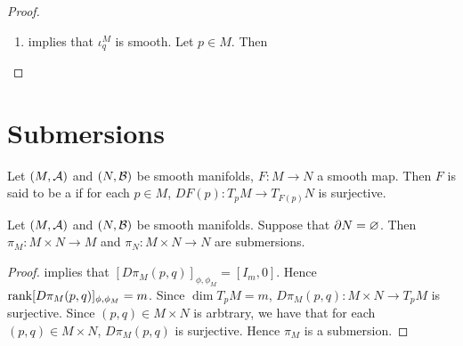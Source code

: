 \documentclass{book}
\begin{document}
	\begin{proof}\
		\begin{enumerate}
			\item {} implies that $\iota_q^M$ is smooth. Let $p \in M$. Then 
		\end{enumerate}
	\end{proof}
































	\newpage
	\section{Submersions}
	
	
	\begin{defn} 
		Let $(M, \mathcal{A})$ and $(N, \mathcal{B})$ be smooth manifolds, $F: M \rightarrow N$ a smooth map. Then $F$ is said to be a  if for each $p \in M$, $DF(p) :T_pM\rightarrow T_{F(p)}N$ is surjective.
	\end{defn}

	\begin{ex} 
		Let $(M, \mathcal{A})$ and $(N, \mathcal{B})$ be smooth manifolds. Suppose that $\partial N = \varnothing$. Then $\pi_M: M \times N \rightarrow M$ and $\pi_N: M \times N \rightarrow N$ are submersions.
	\end{ex}

	\begin{proof}
		 implies that $[D \pi_M(p,q)]_{\phi, \phi_M} = [I_m, 0]$. Hence $\operatorname{\text{rank}} [D \pi_M(p,q)]_{\phi, \phi_M} = m$. Since $\dim T_p M = m$, $D \pi_M(p,q): M \times N \rightarrow T_p M$ is surjective. Since $(p,q) \in M \times N$ is arbtrary, we have that for each $(p,q) \in M \times N$, $D\pi_M(p,q)$ is surjective. Hence $\pi_M$ is a submersion. 
	\end{proof}
	
\end{document}
